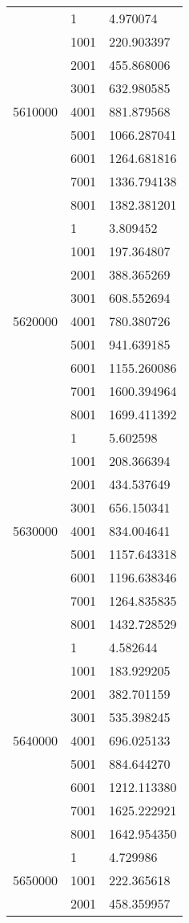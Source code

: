 \begin{table}[htb!]
\begin{tabular}{lll}
\multirow[c]{9}{*}{5610000} & 1 & 4.970074 \\
 & 1001 & 220.903397 \\
 & 2001 & 455.868006 \\
 & 3001 & 632.980585 \\
 & 4001 & 881.879568 \\
 & 5001 & 1066.287041 \\
 & 6001 & 1264.681816 \\
 & 7001 & 1336.794138 \\
 & 8001 & 1382.381201 \\
\multirow[c]{9}{*}{5620000} & 1 & 3.809452 \\
 & 1001 & 197.364807 \\
 & 2001 & 388.365269 \\
 & 3001 & 608.552694 \\
 & 4001 & 780.380726 \\
 & 5001 & 941.639185 \\
 & 6001 & 1155.260086 \\
 & 7001 & 1600.394964 \\
 & 8001 & 1699.411392 \\
\multirow[c]{9}{*}{5630000} & 1 & 5.602598 \\
 & 1001 & 208.366394 \\
 & 2001 & 434.537649 \\
 & 3001 & 656.150341 \\
 & 4001 & 834.004641 \\
 & 5001 & 1157.643318 \\
 & 6001 & 1196.638346 \\
 & 7001 & 1264.835835 \\
 & 8001 & 1432.728529 \\
\multirow[c]{9}{*}{5640000} & 1 & 4.582644 \\
 & 1001 & 183.929205 \\
 & 2001 & 382.701159 \\
 & 3001 & 535.398245 \\
 & 4001 & 696.025133 \\
 & 5001 & 884.644270 \\
 & 6001 & 1212.113380 \\
 & 7001 & 1625.222921 \\
 & 8001 & 1642.954350 \\
\multirow[c]{9}{*}{5650000} & 1 & 4.729986 \\
 & 1001 & 222.365618 \\
 & 2001 & 458.359957 \\

\end{tabular}
\end{table}
